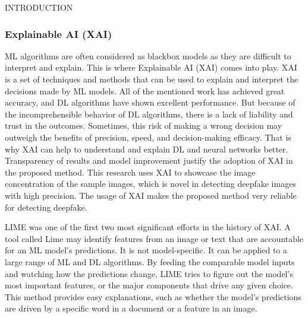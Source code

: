 \begin{section}[]{\uppercase{Introduction}}
    \subsubsection{Explainable AI (XAI)}
    ML algorithms are often considered as blackbox models as they are difficult to interpret and explain. This is where Explainable AI (XAI) comes into play. XAI is a set of techniques and methods that can be used to explain and interpret the decisions made by ML models. \cite{IBMExplainableAI}
    All of the mentioned work has achieved great accuracy, and DL algorithms have shown excellent
    performance. But because of the incomprehensible behavior of DL algorithms, there is a lack of liability
    and trust in the outcomes. Sometimes, this risk of making a wrong decision may outweigh the benefits of
    precision, speed, and decision-making efficacy. That is why XAI can help to understand and explain DL
    and neural networks better. Transparency of results and model improvement justify the adoption of XAI
    in the proposed method.
    This research uses XAI to showcase the image concentration of the sample images, which is novel in
    detecting deepfake images with high precision. The usage of XAI makes the proposed method very
    reliable for detecting deepfake.
    \par LIME \cite{Ribeiro2016} was one of the first two most significant efforts in the
    history of XAI. A tool called Lime may identify features from an image or text that are accountable for
    an ML model’s predictions. It is not model-specific. It can be applied to a large range of ML and DL
    algorithms. By feeding the comparable model inputs and watching how the predictions change, LIME
    tries to figure out the model’s most important features, or the major components that drive any given
    choice. This method provides easy explanations, such as whether the model’s predictions are driven by a
    specific word in a document or a feature in an image.


\end{section}
